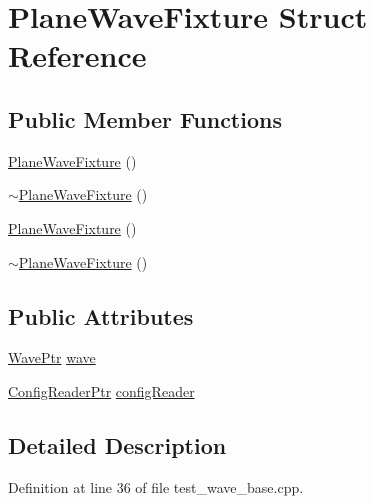 \hypertarget{struct_plane_wave_fixture}{\section{Plane\-Wave\-Fixture Struct Reference}
\label{struct_plane_wave_fixture}
}
\subsection*{Public Member Functions}
\begin{DoxyCompactItemize}
\item 
\hyperlink{struct_plane_wave_fixture_a8eeab5b035afae59a5faed8a56923c7b}{Plane\-Wave\-Fixture} ()
\item 
\hyperlink{struct_plane_wave_fixture_a243054ae7957f9096845a56ebc9a0944}{$\sim$\-Plane\-Wave\-Fixture} ()
\item 
\hyperlink{struct_plane_wave_fixture_a8eeab5b035afae59a5faed8a56923c7b}{Plane\-Wave\-Fixture} ()
\item 
\hyperlink{struct_plane_wave_fixture_a243054ae7957f9096845a56ebc9a0944}{$\sim$\-Plane\-Wave\-Fixture} ()
\end{DoxyCompactItemize}
\subsection*{Public Attributes}
\begin{DoxyCompactItemize}
\item 
\hyperlink{namespace_q_s_t_e_m_ab42c5fe058973736465964e84b504b74}{Wave\-Ptr} \hyperlink{struct_plane_wave_fixture_aba9bfc7d583ff61a51ac04f3c4bacfd1}{wave}
\item 
\hyperlink{namespace_q_s_t_e_m_af9424707fe9f6503298f49b41304bd35}{Config\-Reader\-Ptr} \hyperlink{struct_plane_wave_fixture_a6b8426254e473489b6bc3784e6552462}{config\-Reader}
\end{DoxyCompactItemize}


\subsection{Detailed Description}


Definition at line 36 of file test\-\_\-wave\-\_\-base.\-cpp.



